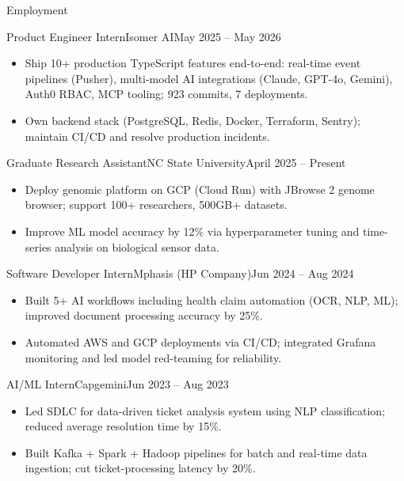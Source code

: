 \documentclass[]{mcdowellcv}
\begin{document}
\makeheader

\begin{cvsection}{Employment}
  \begin{cvsubsection}{Product Engineer Intern}{Isomer AI}{May 2025 -- May 2026}
    \begin{itemize}
      \item Ship 10+ production TypeScript features end-to-end: real-time event pipelines (Pusher), multi-model AI integrations (Claude, GPT-4o, Gemini), Auth0 RBAC, MCP tooling; 923 commits, 7 deployments.
      \item Own backend stack (PostgreSQL, Redis, Docker, Terraform, Sentry); maintain CI/CD and resolve production incidents.
    \end{itemize}
    \vspace{-1.5pt}
  \end{cvsubsection}

  \begin{cvsubsection}{Graduate Research Assistant}{NC State University}{April 2025 -- Present}
    \begin{itemize}
      \item Deploy genomic platform on GCP (Cloud Run) with JBrowse 2 genome browser; support 100+ researchers, 500GB+ datasets.
      \item Improve ML model accuracy by 12\% via hyperparameter tuning and time-series analysis on biological sensor data.
    \end{itemize}
    \vspace{-1.5pt}
  \end{cvsubsection}

  \begin{cvsubsection}{Software Developer Intern}{Mphasis (HP Company)}{Jun 2024 -- Aug 2024}
    \begin{itemize}
      \item Built 5+ AI workflows including health claim automation (OCR, NLP, ML); improved document processing accuracy by 25\%.
      \item Automated AWS and GCP deployments via CI/CD; integrated Grafana monitoring and led model red-teaming for reliability.
    \end{itemize}
    \vspace{-1.5pt}
  \end{cvsubsection}

  \begin{cvsubsection}{AI/ML Intern}{Capgemini}{Jun 2023 -- Aug 2023}
    \begin{itemize}
      \item Led SDLC for data-driven ticket analysis system using NLP classification; reduced average resolution time by 15\%.
      \item Built Kafka + Spark + Hadoop pipelines for batch and real-time data ingestion; cut ticket-processing latency by 20\%.
    \end{itemize}
    \vspace{-1.5pt}
  \end{cvsubsection}
\end{cvsection}
\end{document}
